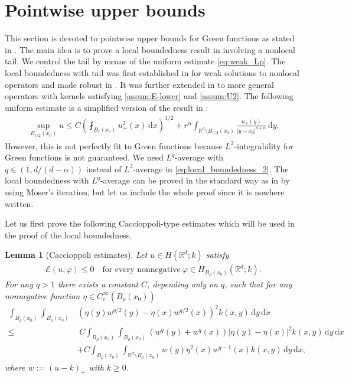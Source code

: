 \documentclass[reqno]{amsart}
\theoremstyle{plain}
\newtheorem{lemma}[theorem]{Lemma}
\theoremstyle{definition}
\numberwithin{equation}{section}
\newcommand{\Rd}{\mathbb{R}^d}
\newcommand{\dx} {\, \mathrm{d}x}
\newcommand{\dy} {\, \mathrm{d}y}
\begin{document}
\section{Pointwise upper bounds} \label{sec:upper-bounds}


This section is devoted to pointwise upper bounds for Green functions as stated in . The main idea is to prove a local boundedness result in  involving a nonlocal tail. We control the tail by means of the uniform estimate \eqref{eq:weak_Lp}. The local boundedness with tail was first established in \cite{DCKP16} for weak solutions to nonlocal operators and made robust in \cite{Coz17}. It was further extended in \cite{Sch20} to more general operators with kernels satisfying \eqref{assum:E-lower} and \eqref{assum:U2}. The following uniform estimate is a simplified version of the result in \cite[Theorem 11.10]{Sch20}:
\begin{align} \label{eq:local_boundedness_2}
\sup_{B_{r/2}(x_0)} u 
\leq C \left( \fint_{B_r(x_0)} u_+^2(x) \dx \right)^{1/2} 
+ r^\alpha \int_{\Rd \setminus B_{r/2}(x_0)} \frac{u_+(y)}{|y-x_0|^{n+\alpha}} \dy.
\end{align}
However, this is not perfectly fit to Green functions because $L^2$-integrability for Green functions is not guaranteed. We need $L^q$-average with $q \in (1, d/(d-\alpha))$ instead of $L^2$-average in 
\eqref{eq:local_boundedness_2}. The local boundedness with $L^q$-average can be proved in the standard way as in \cite{DCKP16, Coz17, Sch20} by using Moser's iteration, but let us include the whole proof since it is nowhere written.

Let us first prove the following Caccioppoli-type estimates 
which will be used in the proof of the local boundedness. 

\begin{lemma} [Caccioppoli estimates] \label{lem:Caccioppoli}
Let $u \in H(\Rd; k)$ satisfy
\begin{align} \label{eq:subsolution}
\mathcal{E}(u, \varphi) \leq 0 \quad\text{for every nonnegative}~
\varphi \in H_{B_{\rho}(x_{0})}(\Rd; k).
\end{align}
For any $q > 1$ there exists a constant $C$, depending only on $q$, 
such that for any nonnegative function $\eta \in C_c^\infty(B_\rho(x_0))$
\begin{align*}
\int_{B_\rho(x_0)} \int_{B_\rho(x_0)} 
&\left( \eta(y) w^{q/2}(y) - \eta(x) w^{q/2}(x) \right)^2 k(x,y) \dy \dx \\
\leq& ~ C \int_{B_\rho(x_0)} \int_{B_\rho(x_0)} (w^q(y) + w^q(x))
|\eta(y) - \eta(x)|^2 k(x,y) \dy \dx \\
&+ C \int_{B_\rho(x_0)} \int_{\Rd \setminus B_\rho(x_0)} w(y) \eta^2(x) w^{q-1}(x) k(x,y) \dy \dx,
\end{align*}
where $w := (u-k)_+$ with $k \geq 0$.
\end{lemma}
\end{document}
